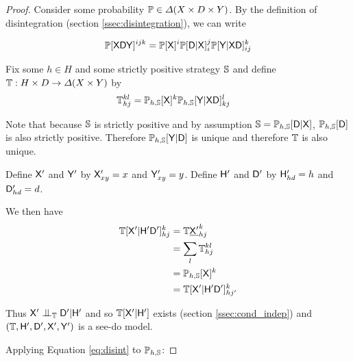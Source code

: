 
\begin{proof}
Consider some probability $\mathbb{P}\in \Delta(X\times D\times Y)$. By the definition of disintegration (section \ref{ssec:disintegration}), we can write

\begin{align}
 \mathbb{P}[\mathsf{XDY}]^{ijk} = \mathbb{P}[\mathsf{X}]^i\mathbb{P}[\mathsf{D}|\mathsf{X}]_i^{j} \mathbb{P}[\mathsf{Y}|\mathsf{XD}]_{ij}^{k} \label{eq:disint}
\end{align}

Fix some $h\in H$ and some strictly positive strategy $\mathbb{S}$ and define $\mathbb{T}:H\times D\to \Delta(X\times Y)$ by
\begin{align}
    \mathbb{T}_{hj}^{kl} &= \mathbb{P}_{h,\mathbb{S}}[\mathsf{X}]^k \mathbb{P}_{h,\mathbb{S}}[\mathsf{Y}|\mathsf{X}\mathsf{D}]^l_{kj} \label{eq:comb_disint}
\end{align}

Note that because $\mathbb{S}$ is strictly positive and by assumption $\mathbb{S}=\mathbb{P}_{h,\mathbb{S}}[\mathsf{D}|\mathsf{X}]$, $\mathbb{P}_{h,\mathbb{S}}[\mathsf{D}]$ is also strictly positive. Therefore $\mathbb{P}_{h,\mathbb{S}}[\mathsf{Y}|\mathsf{D}]$ is unique and therefore $\mathbb{T}$ is also unique.

Define $\mathsf{X}'$ and $\mathsf{Y}'$ by $\mathsf{X}'_{xy}=x$ and $\mathsf{Y}'_{xy}=y$. Define $\mathsf{H}'$ and $\mathsf{D}'$ by $\mathsf{H}'_{hd} = h$ and $\mathsf{D}'_{hd} = d$.

We then have
\begin{align}
    \mathbb{T}[\mathsf{X'}|\mathsf{H'D'}]_{hj}^{k} &= \mathbb{T}\underline{\mathsf{X}'}_{hj}^k\\
                                           &= \sum_l \mathbb{T}_{hj}^{kl} \\
                                           &= \mathbb{P}_{h,\mathbb{S}}[\mathsf{X}]^k\\
                                           &= \mathbb{T}[\mathsf{X'}|\mathsf{H'D'}]_{hj'}^{k}
\end{align}

Thus $\RV{X}'\CI_{\kernel{T}} \RV{D}'|\RV{H}'$ and so $\mathbb{T}[\mathsf{X}'|\mathsf{H}']$ exists (section \ref{ssec:cond_indep}) and $(\mathbb{T},\mathsf{H}',\mathsf{D}',\mathsf{X}',\mathsf{Y}')$ is a see-do model.

Applying Equation \ref{eq:disint} to $\mathbb{P}_{h,\mathbb{S}}$:


\end{proof}
